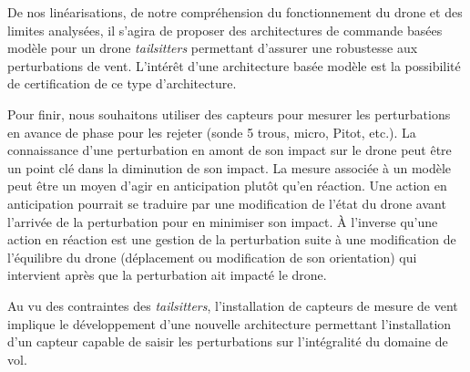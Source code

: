 De nos linéarisations, de notre compréhension du fonctionnement du drone et des limites analysées, il s'agira de proposer des architectures de commande basées modèle pour un drone \textit{tailsitters} permettant d'assurer une robustesse aux perturbations de vent. L'intérêt d'une architecture basée modèle est la possibilité de certification de ce type d'architecture. 

Pour finir, nous souhaitons utiliser des capteurs pour mesurer les perturbations en avance de phase pour les rejeter (sonde 5 trous, micro, Pitot, etc.). La connaissance d'une perturbation en amont de son impact sur le drone peut être un point clé dans la diminution de son impact. La mesure associée à un modèle peut être un moyen d'agir en anticipation plutôt qu'en réaction. Une action en anticipation pourrait se traduire par une modification de l'état du drone avant l'arrivée de la perturbation pour en minimiser son impact. À l'inverse qu'une action en réaction est une gestion de la perturbation suite à une modification de l'équilibre du drone (déplacement ou modification de son orientation) qui intervient après que la perturbation ait impacté le drone.  

Au vu des contraintes des \textit{tailsitters}, l'installation de capteurs de mesure de vent implique le développement d'une nouvelle architecture permettant l'installation d'un capteur capable de saisir les perturbations sur l'intégralité du domaine de vol.

